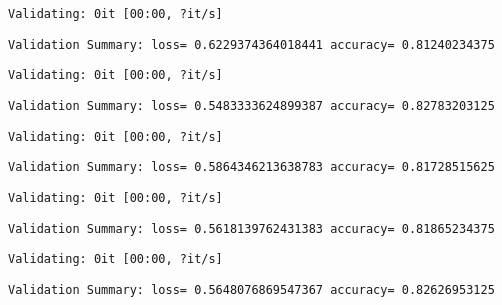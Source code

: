 \documentclass[11pt]{article}
\begin{document}
    
    \begin{Verbatim}[commandchars=\\\{\}]
Validating: 0it [00:00, ?it/s]
    \end{Verbatim}

    
    \begin{Verbatim}[commandchars=\\\{\}]
Validation Summary: loss= 0.6229374364018441 accuracy= 0.81240234375
    \end{Verbatim}

    
    \begin{Verbatim}[commandchars=\\\{\}]
Validating: 0it [00:00, ?it/s]
    \end{Verbatim}

    
    \begin{Verbatim}[commandchars=\\\{\}]
Validation Summary: loss= 0.5483333624899387 accuracy= 0.82783203125
    \end{Verbatim}

    
    \begin{Verbatim}[commandchars=\\\{\}]
Validating: 0it [00:00, ?it/s]
    \end{Verbatim}

    
    \begin{Verbatim}[commandchars=\\\{\}]
Validation Summary: loss= 0.5864346213638783 accuracy= 0.81728515625
    \end{Verbatim}

    
    \begin{Verbatim}[commandchars=\\\{\}]
Validating: 0it [00:00, ?it/s]
    \end{Verbatim}

    
    \begin{Verbatim}[commandchars=\\\{\}]
Validation Summary: loss= 0.5618139762431383 accuracy= 0.81865234375
    \end{Verbatim}

    
    \begin{Verbatim}[commandchars=\\\{\}]
Validating: 0it [00:00, ?it/s]
    \end{Verbatim}

    
    \begin{Verbatim}[commandchars=\\\{\}]
Validation Summary: loss= 0.5648076869547367 accuracy= 0.82626953125
    \end{Verbatim}
\end{document}
